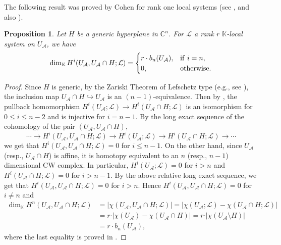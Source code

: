 \documentclass[12pt,leqno,twoside]{amsart}
\theoremstyle{plain}
\newtheorem{prop}[theorem]{Proposition}
\theoremstyle{definition}
\newcommand{\C}{\mathbb{C}}
\newcommand{\K}{\mathbb{K}}
\newcommand{\sA}{\mathcal{A}}
\newcommand{\sL}{\mathcal{L}}
\begin{document}
The following result was proved by Cohen for rank one local systems (see \cite{Coh98}, and also \cite{Coh93}). 
\begin{prop}  \label{prop} Let $H$ be a generic hyperplane in $\C^n$. For $\sL$ a rank $r$ $\K$-local system on $U_\sA$, we have
    $$\dim_\K H^i (U_\sA, U_\sA\cap H; \sL)=\begin{cases}
       r\cdot b_n(U_\sA), & {\rm if } \ i=n,\\
       0, & {\rm otherwise}.
    \end{cases} $$
\end{prop}
\begin{proof}
Since $H$ is generic, 
by the Zariski Theorem of Lefschetz type (e.g., see \cite[Theorem~1.6.5]{Dim92}),
the inclusion map $U_\sA \cap H \hookrightarrow U_\sA $ is an $(n-1)$-equivalence.
Then by \cite[Lemma 5.6]{PS19}, 
the pullback homomorphism $ H^i(U_\sA; \sL)\to  H^i(U_\sA\cap H; \sL)$ is an isomorphism for $0\leq i\leq n-2 $ and is injective for $i=n-1$. 
By the long exact sequence of the cohomology of the pair $(U_\sA, U_\sA \cap H)$,
\[
\cdots \to H^i(U_\sA, U_\sA\cap H; \sL)\to H^i(U_\sA; \sL)\to H^i(U_\sA\cap H; \sL)\to \cdots
\]
we get that $ H^i (U_\sA, U_\sA\cap H; \sL)=0$ for $i\leq n-1$. On the other hand, since $U_\sA$ (resp., $U_\sA \cap H$) is affine,  it is homotopy equivalent to an $n$ (resp., $n-1$) dimensional CW complex. In particular, $H^i(U_\sA;\sL)=0$ for $i>n$ and $H^i(U_\sA\cap H;\sL)=0$ for $i>n-1$. By the above relative long exact sequence, we get that $ H^i (U_\sA, U_\sA\cap H; \sL)=0$ for $i>n$.
Hence $H^i(U_\sA, U_\sA\cap H;\sL)=0$ for $i\neq n$ and
\[
\begin{split}
\dim_\K H^{n}(U_\sA, U_\sA\cap H; \sL)& = \vert \chi(U_\sA, U_\sA\cap H; \sL) \vert =\vert \chi(U_\sA; \sL)-\chi(U_\sA\cap H; \sL) \vert \\ &=
r\cdot \vert \chi(U_\sA)-\chi(U_\sA\cap H) \vert=r\cdot \vert \chi(U_\sA\setminus H) \vert\\
&=r\cdot b_n(U_\sA),
\end{split}
\]
where the last equality is proved in \cite[Lemma 5]{DP}.
\end{proof}
\end{document}
